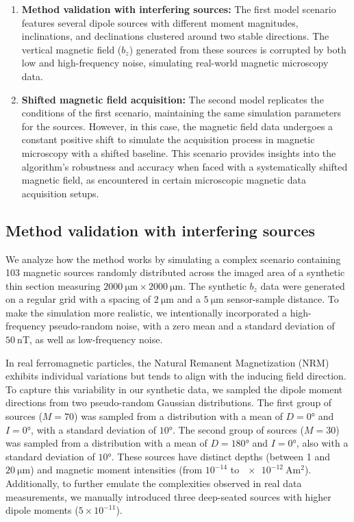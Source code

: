 \begin{enumerate}
\item \textbf{Method validation with interfering sources:}
The first model scenario features several dipole sources with different moment magnitudes, inclinations, and declinations clustered around two stable directions. The vertical magnetic field ($b_z$) generated from these sources is corrupted by both low and high-frequency noise, simulating real-world magnetic microscopy data. 

\item \textbf{Shifted magnetic field acquisition:}
The second model replicates the conditions of the first scenario, maintaining the same simulation parameters for the sources. However, in this case, the magnetic field data undergoes a constant positive shift to simulate the acquisition process in magnetic microscopy with a shifted baseline. This scenario provides insights into the algorithm's robustness and accuracy when faced with a systematically shifted magnetic field, as encountered in certain microscopic magnetic data acquisition setups.
\end{enumerate}

\subsection{Method validation with interfering sources}

We analyze how the method works by simulating a complex scenario containing 103 magnetic sources randomly distributed across the imaged area of a synthetic thin section measuring $\qty{2000}{\um} \times \qty{2000}{\um}$. The synthetic $b_z$ data were generated on a regular grid with a spacing of $\qty{2}{\um}$ and a $\qty{5}{\um}$ sensor-sample distance. To make the simulation more realistic, we intentionally incorporated a high-frequency pseudo-random noise, with a zero mean and a standard deviation of $\qty{50}{\nano\tesla}$, as well as low-frequency noise. 

In real ferromagnetic particles, the Natural Remanent Magnetization (NRM) exhibits individual variations but tends to align with the inducing field direction. To capture this variability in our synthetic data, we sampled the dipole moment directions from two pseudo-random Gaussian distributions. The first group of sources ($M = 70$) was sampled from a distribution with a mean of $D = \ang{0}$ and $I = \ang{0}$, with a standard deviation of $\ang{10}$. The second group of sources ($M = 30$) was sampled from a distribution with a mean of $D = \ang{180}$ and $I = \ang{0}$, also with a standard deviation of $\ang{10}$. These sources have distinct depths (between 1 and $\qty{20}{\um}$) and magnetic moment intensities (from $10^{-14}$ to $\qty{e-12}{\ampere\m\squared}$). Additionally, to further emulate the complexities observed in real data measurements, we manually introduced three deep-seated sources with higher dipole moments ($5 \times 10^{-11}$). 

